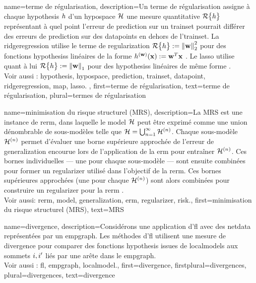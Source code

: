 {name={terme de régularisation}, 
	description={Un terme de régularisation 
		assigne à chaque \gls{hypothesis} $h$ d’un \gls{hypospace} $\mathcal{H}$ une mesure quantitative 
		$\mathcal{R}\big\{ h \big\}$ représentant à quel point l’erreur de \gls{prediction} sur un \gls{trainset} 
		pourrait différer des erreurs de \gls{prediction} sur des \glspl{datapoint} en dehors de l'\gls{trainset}. 
		La \gls{ridgeregression} utilise le terme de \gls{regularization} 
		$\mathcal{R}\big\{ h \big\} := \left\Vert {{\bf w}} \right\Vert_{2}^{2}$ pour des fonctions \glspl{hypothesis} linéaires 
		de la forme $h^{({\bf w})}({\bf x}) := {\bf w}^{T} {\bf x}$ \cite[Ch. 3]{MLBasics}. 
		Le \gls{lasso} utilise quant à lui $\mathcal{R}\big\{ h \big\} := \left\Vert {{\bf w}} \right\Vert_{1}$ 
		pour des \glspl{hypothesis} linéaires de même forme \cite[Ch. 3]{MLBasics}.
		\\
		Voir aussi : \gls{hypothesis}, \gls{hypospace}, \gls{prediction}, \gls{trainset}, \gls{datapoint}, \gls{ridgeregression}, \gls{map}, \gls{lasso}. },
	first={terme de régularisation},
	text={terme de régularisation}, plural={termes de régularisation}
}

{name={minimisation du risque structurel (MRS)}, 
	description={La MRS est une instance de \gls{rerm}, dans laquelle le \gls{model} $\mathcal{H}$ peut être exprimé comme une union dénombrable de sous-modèles telle que $\mathcal{H} = \bigcup_{n=1}^{\infty} \mathcal{H}^{(n)}$. 
		Chaque sous-modèle $\mathcal{H}^{(n)}$ permet d'évaluer une borne supérieure approchée de l’erreur de \gls{generalization} encourue lors de l’application de la \gls{erm} pour entraîner $\mathcal{H}^{(n)}$. 
		Ces bornes individuelles — une pour chaque sous-modèle — sont ensuite combinées pour former un \gls{regularizer} utilisé dans l’objectif de la \gls{rerm}. 
		Ces bornes supérieures approchées (une pour chaque $\mathcal{H}^{(n)}$) sont alors combinées pour construire un \gls{regularizer} pour la \gls{rerm} \cite[Sec.\ 7.2]{ShalevMLBook}.
		\\
		Voir aussi: \gls{rerm}, \gls{model}, \gls{generalization}, \gls{erm}, \gls{regularizer}, \gls{risk}.},
	first={minimisation du risque structurel (MRS)},
	text={MRS}
}

{name={divergence},
	description={Considérons une application d'\gls{fl} avec des \gls{netdata} 
		représentées par un \gls{empgraph}. Les méthodes d'\gls{fl} utilisent une mesure de divergence 
		pour comparer des fonctions \gls{hypothesis} issues de \glspl{localmodel} aux sommets $i,i'$ 
		liés par une arête dans le \gls{empgraph}.
		\\ 
		Voir aussi : \gls{fl}, \gls{empgraph}, \gls{localmodel}.},
	first={divergence},
	firstplural={divergences}, 
	plural={divergences}, 
	text={divergence}
}

